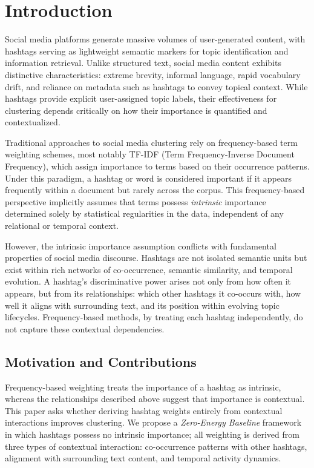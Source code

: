 \documentclass[pdflatex,sn-mathphys-num]{sn-jnl}%
\begin{document}

\section{Introduction}\label{sec1}

Social media platforms generate massive volumes of user-generated content, with hashtags serving as lightweight semantic markers for topic identification and information retrieval. Unlike structured text, social media content exhibits distinctive characteristics: extreme brevity, informal language, rapid vocabulary drift, and reliance on metadata such as hashtags to convey topical context. While hashtags provide explicit user-assigned topic labels, their effectiveness for clustering depends critically on how their importance is quantified and contextualized.

Traditional approaches to social media clustering rely on frequency-based term weighting schemes, most notably TF-IDF (Term Frequency-Inverse Document Frequency), which assign importance to terms based on their occurrence patterns. Under this paradigm, a hashtag or word is considered important if it appears frequently within a document but rarely across the corpus. This frequency-based perspective implicitly assumes that terms possess \emph{intrinsic} importance determined solely by statistical regularities in the data, independent of any relational or temporal context.

However, the intrinsic importance assumption conflicts with fundamental properties of social media discourse. Hashtags are not isolated semantic units but exist within rich networks of co-occurrence, semantic similarity, and temporal evolution. A hashtag's discriminative power arises not only from how often it appears, but from its relationships: which other hashtags it co-occurs with, how well it aligns with surrounding text, and its position within evolving topic lifecycles. Frequency-based methods, by treating each hashtag independently, do not capture these contextual dependencies.

\subsection{Motivation and Contributions}\label{subsec1}

Frequency-based weighting treats the importance of a hashtag as intrinsic, whereas the relationships described above suggest that importance is contextual. This paper asks whether deriving hashtag weights entirely from contextual interactions improves clustering. We propose a \emph{Zero-Energy Baseline} framework in which hashtags possess no intrinsic importance; all weighting is derived from three types of contextual interaction: co-occurrence patterns with other hashtags, alignment with surrounding text content, and temporal activity dynamics.
\end{document}
